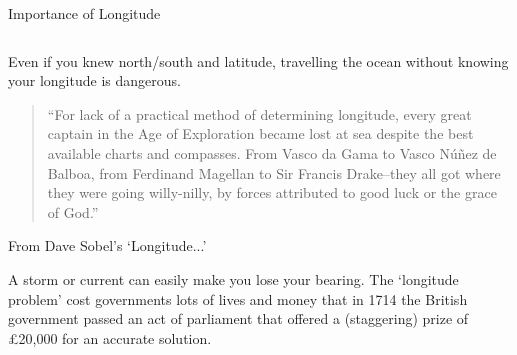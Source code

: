 \begin{myFrame}{Importance of Longitude}{}
	\begin{columns}
		\setCol
		\begin{itemize}
			\col Even if you knew north/south and  latitude, travelling the ocean without knowing your longitude is dangerous.
			\remSpace
			\begin{flushleft}\tiny
				\begin{quotation}
					``For lack of a practical method of determining longitude, every great captain in the Age of Exploration became lost at sea despite the best available charts and compasses. From Vasco da Gama to Vasco N\'u\~{n}ez de Balboa, from Ferdinand Magellan to Sir Francis Drake--they all got where they were going willy-nilly, by forces attributed to good luck or the grace of God.''
				\end{quotation}
				\hfill From Dave Sobel's `Longitude...'~\cite{Sobel1995}
			\end{flushleft}
			\col A storm or current can easily make you lose your bearing.
			\col The `longitude problem' cost governments lots of lives and money that in 1714 the British government passed an act of parliament that offered a (staggering) prize of \pounds20,000 for an accurate solution. 
		\end{itemize}
		\medskip
	\end{columns}
\end{myFrame}


